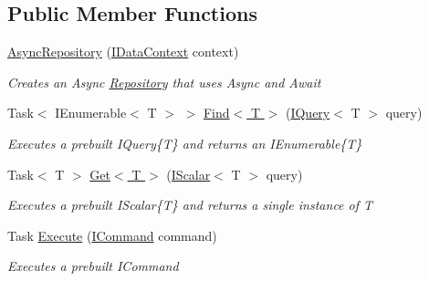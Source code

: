 \subsection*{Public Member Functions}
\begin{DoxyCompactItemize}
\item 
\hyperlink{class_highway_1_1_data_1_1_async_repository_aeaa2c3c79488f1d5741249e6ec1ac783}{Async\-Repository} (\hyperlink{interface_highway_1_1_data_1_1_interfaces_1_1_i_data_context}{I\-Data\-Context} context)
\begin{DoxyCompactList}\small\item\em Creates an Async \hyperlink{class_highway_1_1_data_1_1_repository}{Repository} that uses Async and Await \end{DoxyCompactList}\item 
Task$<$ I\-Enumerable$<$ T $>$ $>$ \hyperlink{class_highway_1_1_data_1_1_async_repository_ad0ad809e167fb82b047270031b6bc47c}{Find$<$ T $>$} (\hyperlink{interface_highway_1_1_data_1_1_interfaces_1_1_i_query-g}{I\-Query}$<$ T $>$ query)
\begin{DoxyCompactList}\small\item\em Executes a prebuilt I\-Query\{\-T\} and returns an I\-Enumerable\{\-T\} \end{DoxyCompactList}\item 
Task$<$ T $>$ \hyperlink{class_highway_1_1_data_1_1_async_repository_a0c032814b93798874cd36b30ecf821dc}{Get$<$ T $>$} (\hyperlink{interface_highway_1_1_data_1_1_interfaces_1_1_i_scalar-g}{I\-Scalar}$<$ T $>$ query)
\begin{DoxyCompactList}\small\item\em Executes a prebuilt I\-Scalar\{\-T\} and returns a single instance of {\itshape T}  \end{DoxyCompactList}\item 
Task \hyperlink{class_highway_1_1_data_1_1_async_repository_afa774a72108c37212f0862fa61a5cec3}{Execute} (\hyperlink{interface_highway_1_1_data_1_1_interfaces_1_1_i_command}{I\-Command} command)
\begin{DoxyCompactList}\small\item\em Executes a prebuilt I\-Command \end{DoxyCompactList}\end{DoxyCompactItemize}
